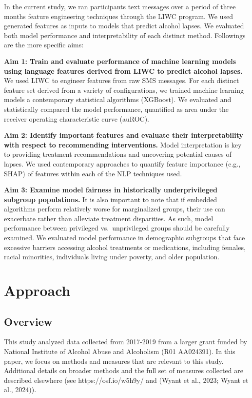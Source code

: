 \documentclass[
  letterpaper,
  DIV=11,
  numbers=noendperiod]{scrartcl}
\begin{document}
In the current study, we ran participants text messages over a period of
three months feature engineering techniques through the LIWC program. We
used generated features as inputs to models that predict alcohol lapses.
We evaluated both model performance and interpretability of each
distinct method. Followings are the more specific aims:

\textbf{Aim 1: Train and evaluate performance of machine learning models
using language features derived from LIWC to predict alcohol lapses.} We
used LIWC to engineer features from raw SMS messages. For each distinct
feature set derived from a variety of configurations, we trained machine
learning models a contemporary statistical algorithms (XGBoost). We
evaluated and statistically compared the model performance, quantified
as area under the receiver operating characteristic curve (auROC).

\textbf{Aim 2: Identify important features and evaluate their
interpretability with respect to recommending interventions.} Model
interpretation is key to providing treatment recommendations and
uncovering potential causes of lapses. We used contemporary approaches
to quantify feature importance (e.g., SHAP) of features within each of
the NLP techniques used.

\textbf{Aim 3: Examine model fairness in historically underprivileged
subgroup populations.} It is also important to note that if embedded
algorithms perform relatively worse for marginalized groups, their use
can exacerbate rather than alleviate treatment disparities. As such,
model performance between privileged vs.~unprivileged groups should be
carefully examined. We evaluated model performance in demographic
subgroups that face excessive barriers accessing alcohol treatments or
medications, including females, racial minorities, individuals living
under poverty, and older population.

\section{Approach}\label{approach}

\subsection{Overview}\label{overview}

This study analyzed data collected from 2017-2019 from a larger grant
funded by National Institute of Alcohol Abuse and Alcoholism (R01
AA024391). In this paper, we focus on methods and measures that are
relevant to this study. Additional details on broader methods and the
full set of measures collected are described elsewhere (see
https://osf.io/w5h9y/ and (Wyant et al., 2023; Wyant et al., 2024)).
\end{document}
